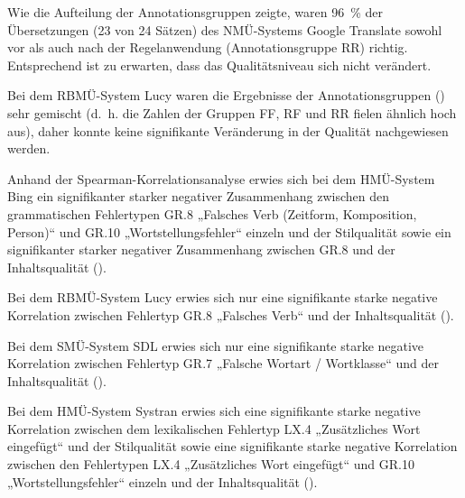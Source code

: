 Wie die Aufteilung der Annotationsgruppen zeigte, waren 96~\% der Übersetzungen (23 von 24 Sätzen) des NMÜ-Systems Google Translate sowohl vor als auch nach der Regelanwendung (Annotationsgruppe RR) richtig. Entsprechend ist zu erwarten, dass das Qualitätsniveau sich nicht verändert.

Bei dem RBMÜ-System Lucy waren die Ergebnisse der Annotationsgruppen () sehr gemischt (d.~h. die Zahlen der Gruppen FF, RF und RR fielen ähnlich hoch aus), daher konnte keine signifikante Veränderung in der Qualität nachgewiesen werden.


Anhand der Spearman-Korrelationsanalyse erwies sich bei dem HMÜ-System Bing ein signifikanter starker negativer Zusammenhang zwischen den grammatischen Fehlertypen GR.8 „Falsches Verb (Zeitform, Komposition, Person)“ und GR.10 „Wortstellungsfehler“ einzeln und der Stilqualität sowie ein signifikanter starker negativer Zusammenhang zwischen GR.8 und der Inhaltsqualität ().

Bei dem RBMÜ-System Lucy erwies sich nur eine signifikante starke negative Korrelation zwischen Fehlertyp GR.8 „Falsches Verb“ und der Inhaltsqualität ().

\newpage
Bei dem SMÜ-System SDL erwies sich nur eine signifikante starke negative Korrelation zwischen Fehlertyp GR.7 „Falsche Wortart / Wortklasse“ und der Inhaltsqualität ().

Bei dem HMÜ-System Systran erwies sich eine signifikante starke negative Korrelation zwischen dem lexikalischen Fehlertyp LX.4 „Zusätzliches Wort eingefügt“ und der Stilqualität sowie eine signifikante starke negative Korrelation zwischen den Fehlertypen LX.4 „Zusätzliches Wort eingefügt“ und GR.10 „Wortstellungsfehler“ einzeln und der Inhaltsqualität ().


